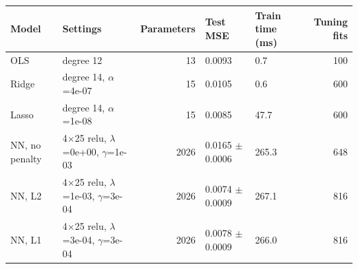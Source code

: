 \begin{tabular}{llrllr}
\toprule
Model & Settings & Parameters & Test MSE & Train time (ms) & Tuning fits \\
\midrule
OLS & degree 12 & 13 & 0.0093 & 0.7 & 100 \\
Ridge & degree 14, $\alpha$=4e-07 & 15 & 0.0105 & 0.6 & 600 \\
Lasso & degree 14, $\alpha$=1e-08 & 15 & 0.0085 & 47.7 & 600 \\
NN, no penalty & 4$\times$25 relu, $\lambda$=0e+00, $\gamma$=1e-03 & 2026 & 0.0165 $\pm$ 0.0006 & 265.3 & 648 \\
NN, L2 & 4$\times$25 relu, $\lambda$=1e-03, $\gamma$=3e-04 & 2026 & 0.0074 $\pm$ 0.0009 & 267.1 & 816 \\
NN, L1 & 4$\times$25 relu, $\lambda$=3e-04, $\gamma$=3e-04 & 2026 & 0.0078 $\pm$ 0.0009 & 266.0 & 816 \\
\bottomrule
\end{tabular}
